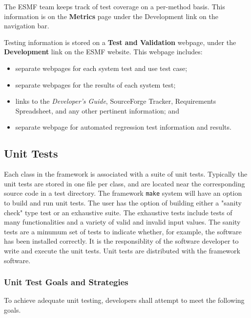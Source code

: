 The ESMF team keeps track of test coverage on a per-method basis.
This information is on the {\bf Metrics} page under the {Development}
link on the navigation bar.

Testing information is stored on a {\bf Test and Validation} webpage,
under the {\bf Development} link on the ESMF 
website.  This webpage includes:
\begin{itemize}
\item separate webpages for each system test and use test case;
\item separate webpages for the results of each system test;
\item links to the {\it Developer's Guide}, SourceForge Tracker, Requirements 
Spreadsheet, and any other pertinent information; and
\item separate webpage for automated regression test information and results.
\end{itemize}

\subsection{Unit Tests}

Each class in the framework is associated with a suite of unit tests.
Typically the unit tests are stored in one file per class, and are
located near the corresponding source code in a test directory.  The 
framework {\tt make} system will have an option to build and run unit tests.
The user has the option of building either a "sanity check" type test
or an exhaustive suite. The exhaustive tests include tests of many 
functionalities and a variety of valid and invalid input values. The sanity 
tests are a minumum set of tests to indicate whether, for example, the 
software has been installed correctly. It is the responsiblity of the 
software developer to write and execute the unit tests. Unit tests 
are distributed with the framework software.

\subsubsection{Unit Test Goals and Strategies}

To achieve adequate unit testing, developers shall attempt to meet the following goals. 

